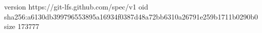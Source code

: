 version https://git-lfs.github.com/spec/v1
oid sha256:a6130db399796553895a16934f0387d48a72bb6310a26791e259b1711b0290b0
size 173777
